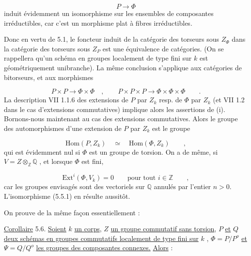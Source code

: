\begin{equation*}
P \longrightarrow \Phi
\end{equation*}
induit évidemment un isomorphisme sur les ensembles de composantes irréductibles, car c'est un morphisme plat à fibres irréductibles.



Donc en vertu de 5.1, le foncteur induit de la catégorie des torseurs sous $Z_{\Phi}$ dans la catégorie des torseurs sous $Z_{P}$ est une équivalence de catégories. (On se rappellera qu'un schéma en groupes localement de type fini sur $k$ est géométriquement unibranche). La même conclusion s'applique aux catégories de bitorseurs, et aux morphismes

\begin{equation*}
P \times P \longrightarrow \Phi \times \Phi \quad , \qquad P \times P \times P \longrightarrow \Phi \times \Phi \times \Phi \qquad .
\end{equation*}
La description VII 1.1.6 des extensions de $P$ par $Z_{k}$ resp. de $\Phi$ par $Z_{k}$ (et VII 1.2 dans le cas d'extensions commutatives) implique alors les assertions de (i). Bornons-nous maintenant au cas des extensions commutatives. Alors le groupe des automorphismes d'une extension de $P$ par $Z_{k}$ est le groupe

\begin{equation*}
\mathrm{Hom}(P,Z_{k}) \quad \simeq \quad \mathrm{Hom}(\Phi,Z_{k}) \qquad ,
\end{equation*}
qui est évidemment nul si $\Phi$ est un groupe de torsion. On a de même, si $V = Z\otimes_{\mathbb{Z}}\mathbb{Q}$ , et lorsque $\Phi$ est fini,

\begin{equation*}
\mathrm{Ext}^{i}(\Phi,V_{k}) = 0 \qquad \text{pour tout } i \in \mathbb{Z} \qquad ,
\end{equation*}
car les groupes envisagés sont des vectoriels sur $\mathbb{Q}$ annulés par l'entier $n > 0$. L'isomorphisme (5.5.1) en résulte aussitôt.

On prouve de la même façon essentiellement :

\underline{Corollaire} 5.6. \underline{Soient} $k$ \underline{un corps}, $Z$ \underline{un groupe commutatif sans torsion}, $P$ \underline{et} $Q$ \underline{deux schémas en groupes commutatifs localement de type fini sur} $k$ , $\Phi = P/P^{o}$ \underline{et} $\Psi = Q/Q^{o}$ \underline{les groupes des composantes connexes.} \underline{Alors} :

